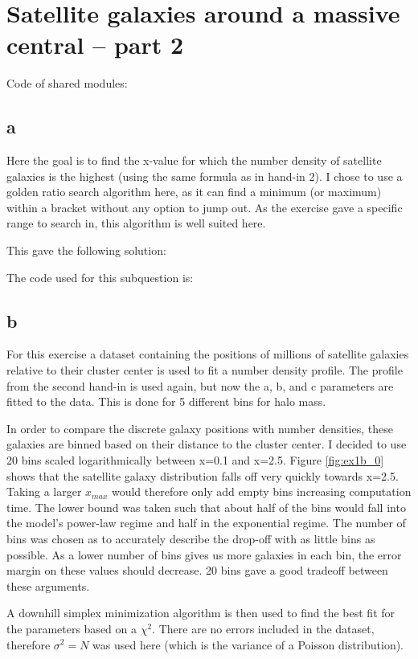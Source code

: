 \section{Satellite galaxies around a massive central – part 2}
Code of shared modules:


\newpage
\subsection*{a}
Here the goal is to find the x-value for which the number density of satellite galaxies is the highest (using the same formula as in hand-in 2).
I chose to use a golden ratio search algorithm here, as it can find a minimum (or maximum) within a bracket without any option to jump out.
As the exercise gave a specific range to search in, this algorithm is well suited here.

This gave the following solution:


The code used for this subquestion is:


\subsection*{b}
For this exercise a dataset containing the positions of millions of satellite galaxies relative to their cluster center is used to fit a number density profile.
The profile from the second hand-in is used again, but now the a, b, and c parameters are fitted to the data.
This is done for 5 different bins for halo mass.

In order to compare the discrete galaxy positions with number densities, these galaxies are binned based on their distance to the cluster center.
I decided to use 20 bins scaled logarithmically between x=0.1 and x=2.5. 
Figure \ref{fig:ex1b_0} shows that the satellite galaxy distribution falls off very quickly towards x=2.5. 
Taking a larger $x_{max}$ would therefore only add empty bins increasing computation time.
The lower bound was taken such that about half of the bins would fall into the model's power-law regime and half in the exponential regime.
The number of bins was chosen as to accurately describe the drop-off with as little bins as possible.
As a lower number of bins gives us more galaxies in each bin, the error margin on these values should decrease.
20 bins gave a good tradeoff between these arguments.

A downhill simplex minimization algorithm is then used to find the best fit for the parameters based on a $\chi^2$.
There are no errors included in the dataset, therefore $\sigma^2 = N$ was used here (which is the variance of a Poisson distribution).

